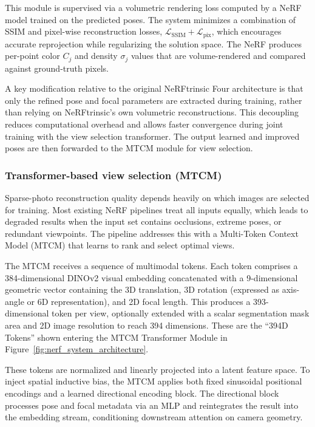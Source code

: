 \documentclass[9pt,openany]{extbook}
\begin{document}
This module is supervised via a volumetric rendering loss computed by a NeRF model trained on the predicted poses. The system minimizes a combination of SSIM and pixel-wise reconstruction losses, $\mathcal{L}_{\text{SSIM}} + \mathcal{L}_{\text{pix}}$, which encourages accurate reprojection while regularizing the solution space. The NeRF produces per-point color $C_j$ and density $\sigma_j$ values that are volume-rendered and compared against ground-truth pixels.

A key modification relative to the original NeRFtrinsic Four architecture is that only the refined pose and focal parameters are extracted during training, rather than relying on NeRFtrinsic's own volumetric reconstructions. This decoupling reduces computational overhead and allows faster convergence during joint training with the view selection transformer. The output learned and improved poses are then forwarded to the MTCM module for view selection.


\subsubsection{Transformer-based view selection (MTCM)}
\label{sec:mtcm}

Sparse-photo reconstruction quality depends heavily on which images are selected for training. Most existing NeRF pipelines treat all inputs equally, which leads to degraded results when the input set contains occlusions, extreme poses, or redundant viewpoints. The pipeline addresses this with a Multi-Token Context Model (MTCM) that learns to rank and select optimal views.

The MTCM receives a sequence of multimodal tokens. Each token comprises a 384-dimensional DINOv2 visual embedding concatenated with a 9-dimensional geometric vector containing the 3D translation, 3D rotation (expressed as axis-angle or 6D representation), and 2D focal length. This produces a 393-dimensional token per view, optionally extended with a scalar segmentation mask area and 2D image resolution to reach 394 dimensions. These are the ``394D Tokens'' shown entering the MTCM Transformer Module in Figure~\ref{fig:nerf_system_architecture}.

These tokens are normalized and linearly projected into a latent feature space. To inject spatial inductive bias, the MTCM applies both fixed sinusoidal positional encodings and a learned directional encoding block. The directional block processes pose and focal metadata via an MLP and reintegrates the result into the embedding stream, conditioning downstream attention on camera geometry.
\end{document}
